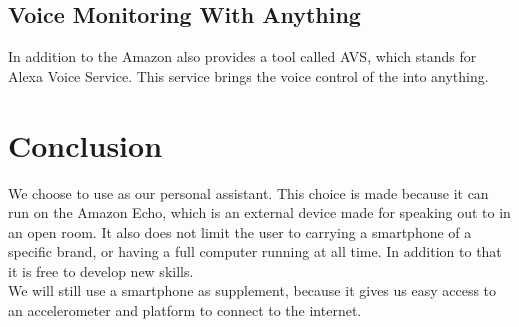 \subsection{Voice Monitoring With Anything}
In addition to the \alexa Amazon also provides a tool called AVS, which stands for Alexa Voice Service. This service brings the voice control of the \alexa into anything. 


\section{Conclusion}
We choose to use \alexa as our personal assistant. This choice is made because it can run on the Amazon Echo, which is an external device made for speaking out to in an open room. It also does not limit the user to carrying a smartphone of a specific brand, or having a full computer running at all time. In addition to that it is free to develop new skills.\\
We will still use a smartphone as supplement, because it gives us easy access to an accelerometer and platform to connect to the internet.
